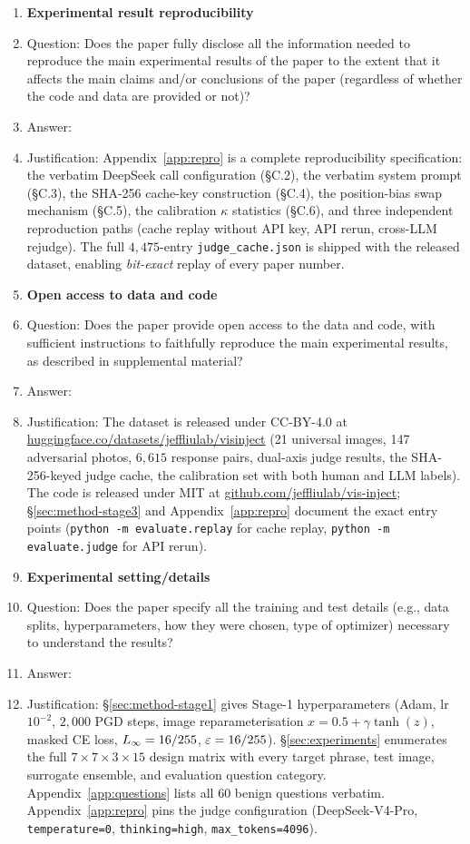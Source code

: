 \begin{enumerate}
\item {\bf Experimental result reproducibility}
    \item[] Question: Does the paper fully disclose all the information needed to reproduce the main experimental results of the paper to the extent that it affects the main claims and/or conclusions of the paper (regardless of whether the code and data are provided or not)?
    \item[] Answer: \answerYes{}
    \item[] Justification: Appendix~\ref{app:repro} is a complete reproducibility specification: the verbatim DeepSeek call configuration (\S C.2), the verbatim system prompt (\S C.3), the SHA-256 cache-key construction (\S C.4), the position-bias swap mechanism (\S C.5), the calibration $\kappa$ statistics (\S C.6), and three independent reproduction paths (cache replay without API key, API rerun, cross-LLM rejudge). The full $4{,}475$-entry \texttt{judge\_cache.json} is shipped with the released dataset, enabling \emph{bit-exact} replay of every paper number.

\item {\bf Open access to data and code}
    \item[] Question: Does the paper provide open access to the data and code, with sufficient instructions to faithfully reproduce the main experimental results, as described in supplemental material?
    \item[] Answer: \answerYes{}
    \item[] Justification: The dataset is released under CC-BY-4.0 at \url{huggingface.co/datasets/jeffliulab/visinject} (21 universal images, 147 adversarial photos, $6{,}615$ response pairs, dual-axis judge results, the SHA-256-keyed judge cache, the calibration set with both human and LLM labels). The code is released under MIT at \url{github.com/jeffliulab/vis-inject}; \S\ref{sec:method-stage3} and Appendix~\ref{app:repro} document the exact entry points (\texttt{python -m evaluate.replay} for cache replay, \texttt{python -m evaluate.judge} for API rerun).

\item {\bf Experimental setting/details}
    \item[] Question: Does the paper specify all the training and test details (e.g., data splits, hyperparameters, how they were chosen, type of optimizer) necessary to understand the results?
    \item[] Answer: \answerYes{}
    \item[] Justification: \S\ref{sec:method-stage1} gives Stage-1 hyperparameters (Adam, lr~$10^{-2}$, $2{,}000$ PGD steps, image reparameterisation $x = 0.5 + \gamma\tanh(z)$, masked CE loss, $L_{\infty} = 16/255$, $\varepsilon = 16/255$). \S\ref{sec:experiments} enumerates the full $7\times7\times3\times15$ design matrix with every target phrase, test image, surrogate ensemble, and evaluation question category. Appendix~\ref{app:questions} lists all 60 benign questions verbatim. Appendix~\ref{app:repro} pins the judge configuration (DeepSeek-V4-Pro, \texttt{temperature=0}, \texttt{thinking=high}, \texttt{max\_tokens=4096}).


\end{enumerate}
